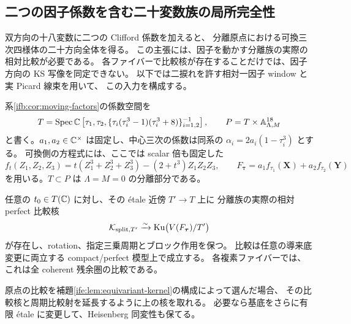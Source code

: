 \subsection{二つの因子係数を含む二十変数族の局所完全性}
\label{ifv:subsec:versal}

双方向の十八変数に二つの Clifford 係数を加えると、
分離原点における可換三次四様体の二十方向全体を得る。
この主張には、因子を動かす分離族の実際の相対比較が必要である。
各ファイバーで比較核が存在することだけでは、因子方向の KS 写像を同定できない。
以下では二捩れを許す相対一因子 window と実 Picard 線束を用いて、
この入力を構成する。

系\ref{ifb:cor:moving-factors}の係数空間を
\[
 T=\operatorname{Spec}\mathbb C\left[\tau_1,\tau_2,
   \{\tau_i(\tau_i^3-1)(\tau_i^3+8)\}_{i=1,2}^{-1}\right],
 \qquad P=T\times\mathbb A^{18}_{\Lambda,M}
\]
と書く。$a_1,a_2\in\mathbb C^\times$ は固定し、中心三次の係数は同系の
$\alpha_i=2a_i(1-\tau_i^3)$ とする。
可換側の方程式には、ここでは scalar 倍も固定した
\begin{equation}\label{ifv:eq:point-equations}
 f_t(Z_1,Z_2,Z_3)
   =t(Z_1^3+Z_2^3+Z_3^3)-(2+t^3)Z_1Z_2Z_3,
 \qquad F_{\boldsymbol\tau}=a_1f_{\tau_1}(\mathbf X)
                                  +a_2f_{\tau_2}(\mathbf Y)
\end{equation}
を用いる。$T\subset P$ は $\Lambda=M=0$ の分離部分である。

\begin{lemma}[動く二捩れ因子の分離比較]
\label{ifv:lem:moving-split-kernel}
任意の $t_0\in T(\mathbb C)$ に対し、その \'etale 近傍 $T'\to T$ 上に
分離族の実際の相対 perfect 比較核
\[
 \mathcal K_{\mathrm{split},T'}
     \xrightarrow{\sim}\operatorname{Ku}\bigl(V(F_{\boldsymbol\tau})/T'\bigr)
\]
が存在し、rotation、指定三乗周期とブロック作用を保つ。
比較は任意の導来底変更に両立する compact/perfect 模型上で成立する。
各複素ファイバーでは、これは全 coherent 残余圏の比較である。

原点の比較を補題\ref{ife:lem:equivariant-kernel}の構成によって選んだ場合、
その比較核と周期比較射を延長するように上の核を取れる。
必要なら基底をさらに有限 \'etale に変更して、Heisenberg 同変性も保てる。
\end{lemma}


